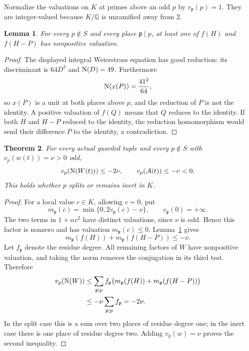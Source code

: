 \documentclass[11pt,a4paper]{article}
\newtheorem{theorem}{Theorem}[section]
\newtheorem{lemma}[theorem]{Lemma}
\newcommand{\Q}{\mathbb Q}\newcommand{\Z}{\mathbb Z}
\begin{document}
Normalize the valuations on $K$ at primes above an odd $p$ by
$v_{\mathfrak p}(p)=1$. They are integer-valued because $K/\Q$
is unramified away from $2$.

\begin{lemma}\label{lem:reference}
For every $p\notin S$ and every place $\mathfrak p\mid p$,
at least one of $f(H)$ and $f(H-P)$ has nonpositive valuation.
\end{lemma}
\begin{proof}
The displayed integral Weierstrass equation has good reduction:
its discriminant is $64D^3$ and $\operatorname{N}(D)=49$.
Furthermore
\[
                           \operatorname{N}(x(P))=\frac{41^2}{64},
\]
so $x(P)$ is a unit at both places above $p$, and the reduction of
$P$ is not the identity. A positive valuation of $f(Q)$ means that
$Q$ reduces to the identity. If both $H$ and $H-P$ reduced to the
identity, the reduction homomorphism would send their difference
$P$ to the identity, a contradiction.
\end{proof}

\begin{theorem}\label{thm:local}
For every actual guarded tuple and every $p\notin S$ with
$v_p(w(t))=\nu>0$ odd,
\begin{equation}\label{eq:bound}
                 v_p(\operatorname{N}(W(t)))\le-2\nu,
                 \qquad v_p(\mathcal A(t))\le-\nu<0.
\end{equation}
This holds whether $p$ splits or remains inert in $K$.
\end{theorem}
\begin{proof}
For a local value $c\in K$, allowing $c=0$, put
\[
              m_{\mathfrak p}(c)=\min\{0,2v_{\mathfrak p}(c)-\nu\},
              \qquad v_{\mathfrak p}(0)=+\infty.
\]
The two terms in $1+\alpha c^2$ have distinct valuations, since
$\nu$ is odd. Hence this factor is nonzero and has valuation
$m_{\mathfrak p}(c)\le0$.
Lemma~\ref{lem:reference} gives
\begin{equation}\label{eq:pairbound}
 m_{\mathfrak p}(f(H))+m_{\mathfrak p}(f(H-P))\le-\nu.
\end{equation}
Let $f_{\mathfrak p}$ denote the residue degree. All remaining
factors of $W$ have nonpositive valuation, and taking the norm
removes the conjugation in its third test. Therefore
\begin{align*}
 v_p(\operatorname{N}(W))
 &\le\sum_{\mathfrak p\mid p}f_{\mathfrak p}
       \bigl(m_{\mathfrak p}(f(H))+
             m_{\mathfrak p}(f(H-P))\bigr)\\
 &\le-\nu\sum_{\mathfrak p\mid p}f_{\mathfrak p}=-2\nu.
\end{align*}
In the split case this is a sum over two places of residue degree
one; in the inert case there is one place of residue degree two.
Adding $v_p(w)=\nu$ proves the second inequality.
\end{proof}
\end{document}
